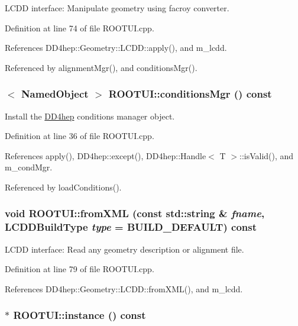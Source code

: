 LCDD interface: Manipulate geometry using facroy converter. 

Definition at line 74 of file ROOTUI.cpp.

References DD4hep::Geometry::LCDD::apply(), and m\_\-lcdd.

Referenced by alignmentMgr(), and conditionsMgr().\hypertarget{class_d_d4hep_1_1_r_o_o_t_u_i_a8a768db5f211c292dc2a752e6339eec6}{
\subsubsection[{conditionsMgr}]{$<$ {\bf NamedObject} $>$ ROOTUI::conditionsMgr () const}}
\label{class_d_d4hep_1_1_r_o_o_t_u_i_a8a768db5f211c292dc2a752e6339eec6}


Install the \hyperlink{namespace_d_d4hep}{DD4hep} conditions manager object. 

Definition at line 36 of file ROOTUI.cpp.

References apply(), DD4hep::except(), DD4hep::Handle$<$ T $>$::isValid(), and m\_\-condMgr.

Referenced by loadConditions().\hypertarget{class_d_d4hep_1_1_r_o_o_t_u_i_add5b84b3c19270a94e7c23d6bf7e3692}{
\subsubsection[{fromXML}]{\setlength{\rightskip}{0pt plus 5cm}void ROOTUI::fromXML (const std::string \& {\em fname}, \/  {\bf LCDDBuildType} {\em type} = {\ttfamily BUILD\_\-DEFAULT}) const}}
\label{class_d_d4hep_1_1_r_o_o_t_u_i_add5b84b3c19270a94e7c23d6bf7e3692}


LCDD interface: Read any geometry description or alignment file. 

Definition at line 79 of file ROOTUI.cpp.

References DD4hep::Geometry::LCDD::fromXML(), and m\_\-lcdd.\hypertarget{class_d_d4hep_1_1_r_o_o_t_u_i_ab1866996cf6e9cc337a67373fde2e83e}{
\subsubsection[{instance}]{ $\ast$ ROOTUI::instance () const}}
\label{class_d_d4hep_1_1_r_o_o_t_u_i_ab1866996cf6e9cc337a67373fde2e83e}


